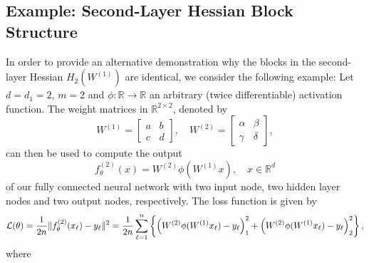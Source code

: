 \documentclass{article}
\begin{document}
\subsection{Example: Second-Layer Hessian Block Structure}\label{sec:block-hessian}
\setcounter{equation}{0}
\renewcommand{\theequation}{C.\arabic{equation}}
In order to provide an alternative demonstration why the blocks in the second-layer Hessian $H_2(W^{(1)})$ are identical, we consider the following example: Let $d=d_1=2$, $m=2$ and $\phi:\mathbb{R}\to\mathbb{R}$ an arbitrary (twice differentiable) activation function. The weight matrices in $\mathbb{R}^{2\times 2}$, denoted by
\begin{equation}
W^{(1)}=\begin{bmatrix}a&b\\c&d\end{bmatrix},\quad W^{(2)}=\begin{bmatrix}\alpha&\beta\\\gamma&\delta\end{bmatrix},
\end{equation}
can then be used to compute the output
\begin{equation}
f^{(2)}_\theta(x)=W^{(2)}\phi(W^{(1)}x),\quad x\in\mathbb{R}^d
\end{equation}
of our fully connected neural network with two input node, two hidden layer nodes and two output nodes, respectively. The loss function is given by
\begin{equation}
\mathcal{L}(\theta)=\frac{1}{2n}\|f^{(2)}_\theta(x_\ell)-y_\ell\|^2=\frac{1}{2n}\sum_{\ell=1}^n\left\{\left(W^{(2)}\phi(W^{(1)}x_\ell)-y_\ell\right)_1^2+\left(W^{(2)}\phi(W^{(1)}x_\ell)-y_\ell\right)_2^2\right\}, \notag
\end{equation}
where
\end{document}
